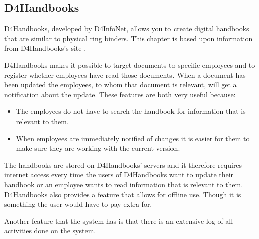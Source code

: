 \subsection{D4Handbooks}

D4Handbooks, developed by D4InfoNet, allows you to create digital handbooks that are similar to physical ring binders.
This chapter is based upon information from D4Handbooks's site \cite{D4Handbook}.

D4Handbooks makes it possible to target documents to specific employees and to register whether employees have read those documents.
When a document has been updated the employees, to whom that document is relevant, will get a notification about the update.
These features are both very useful because:

\begin{itemize}
        \item
        The employees do not have to search the handbook for information that is relevant to them.
        \item
        When employees are immediately notified of changes it is easier for them to make sure they are working with the current version.
\end{itemize}

The handbooks are stored on D4Handbooks' servers and it therefore requires internet access every time the users of D4Handbooks want to update their handbook or an employee wants to read information that is relevant to them.
D4Handbooks also provides a feature that allows for offline use.
Though it is something the user would have to pay extra for.

Another feature that the system has is that there is an extensive log of all activities done on the system.
